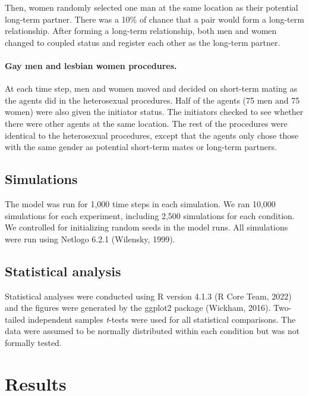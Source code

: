 \documentclass[
  11pt,
]{article}
\begin{document}
Then, women randomly selected one man at the same location as their
potential long-term partner. There was a 10\% of chance that a pair
would form a long-term relationship. After forming a long-term
relationship, both men and women changed to coupled status and register
each other as the long-term partner.

\hypertarget{gay-men-and-lesbian-women-procedures.}{%
\paragraph{Gay men and lesbian women
procedures.}\label{gay-men-and-lesbian-women-procedures.}}

At each time step, men and women moved and decided on short-term mating
as the agents did in the heterosexual procedures. Half of the agents (75
men and 75 women) were also given the initiator status. The initiators
checked to see whether there were other agents at the same location. The
rest of the procedures were identical to the heterosexual procedures,
except that the agents only chose those with the same gender as
potential short-term mates or long-term partners.

\hypertarget{simulations}{%
\subsection{Simulations}\label{simulations}}

The model was run for 1,000 time steps in each simulation. We ran 10,000
simulations for each experiment, including 2,500 simulations for each
condition. We controlled for initializing random seeds in the model
runs. All simulations were run using Netlogo 6.2.1 (Wilensky, 1999).

\hypertarget{statistical-analysis}{%
\subsection{Statistical analysis}\label{statistical-analysis}}

Statistical analyses were conducted using R version 4.1.3 (R Core Team,
2022) and the figures were generated by the ggplot2 package (Wickham,
2016). Two-tailed independent samples \emph{t}-tests were used for all
statistical comparisons. The data were assumed to be normally
distributed within each condition but was not formally tested.

\hypertarget{results}{%
\section{Results}\label{results}}
\end{document}
